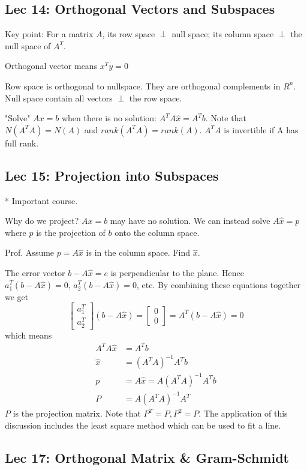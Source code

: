 \subsection{Lec 14: Orthogonal Vectors and Subspaces}

Key point: For a matrix $A$, its row space $\perp$ null space; its column space
$\perp$ the null space of $A^T$.

Orthogonal vector means $x^Ty=0$

Row space is orthogonal to nullspace. They are orthogonal complements in $R^n$.
Null space contain all vectors $\perp$ the row space.

"Solve" $Ax=b$ when there is no solution: $A^TA\hat{x}=A^T b$.
Note that $N(A^TA)=N(A)$ and $rank(A^TA)=rank(A)$. $A^TA$ is invertible if
A has full rank.

\subsection{Lec 15: Projection into Subspaces}

* Important course.

Why do we project? $Ax=b$ may have no solution. We can instead solve $A\hat{x}=p$
where $p$ is the projection of $b$ onto the column space.

Prof. Assume $p=A\hat{x}$ is in the column space. Find $\hat{x}$.

The error vector $b-A\hat{x}=e$ is perpendicular to the plane. Hence
$a_1^T (b-A\hat{x})=0$, $a_2^T(b-A\hat{x})=0$, etc. By combining these
equations together we get
$$ \begin{bmatrix}a_1^T \\ a_2^T \end{bmatrix} (b-A\hat{x}) =
	\begin{bmatrix} 0 \\ 0 \end{bmatrix} = A^T(b-A\hat{x}) = 0 $$
which means
\begin{align}
	A^TA\hat{x} &= A^Tb \\
	\hat{x} &= (A^TA)^{-1}A^Tb \\
	p &= A\hat{x} = A(A^TA)^{-1}A^Tb \\
	P &= A(A^TA)^{-1}A^T
\end{align}
$P$ is the projection matrix. Note that $P^T=P, P^2=P$.
The application of this discussion includes the least square method which
can be used to fit a line.

\subsection{Lec 17: Orthogonal Matrix \& Gram-Schmidt}

